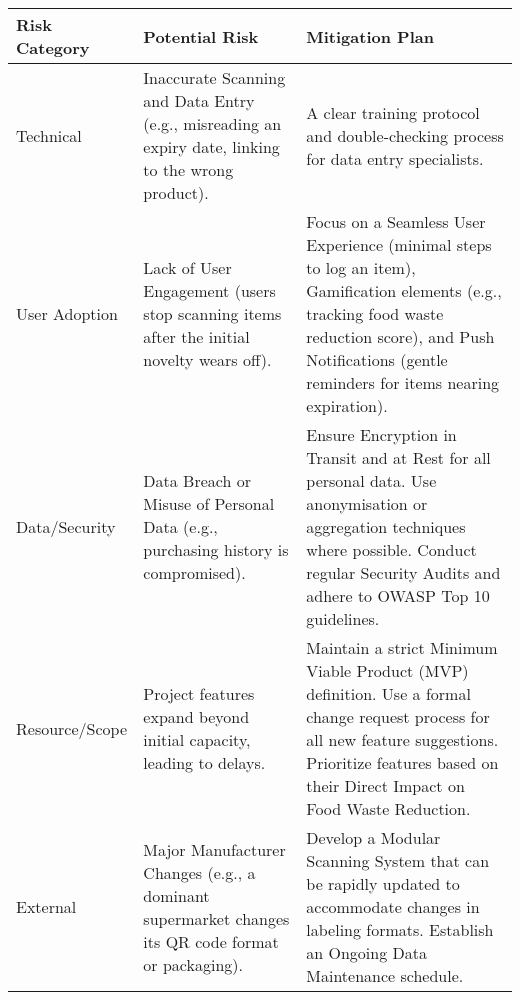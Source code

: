 \begin{center}
\begin{tabular}{| p{2cm} | p{5cm} | p{7cm} |}
    \hline
    \textbf{Risk Category} & \textbf{Potential Risk} & \textbf{Mitigation Plan} \\
    \hline
    Technical & Inaccurate Scanning and Data Entry (e.g., misreading an expiry date, linking to the wrong product). & A clear training protocol and double-checking process for data entry specialists. \\
    \hline
    User Adoption & Lack of User Engagement (users stop scanning items after the initial novelty wears off). & Focus on a Seamless User Experience (minimal steps to log an item), Gamification elements (e.g., tracking food waste reduction score), and Push Notifications (gentle reminders for items nearing expiration). \\
    \hline
    Data/Security & Data Breach or Misuse of Personal Data (e.g., purchasing history is compromised). & Ensure Encryption in Transit and at Rest for all personal data. Use anonymisation or aggregation techniques where possible. Conduct regular Security Audits and adhere to OWASP Top 10 guidelines. \\
    \hline
    Resource/Scope & Project features expand beyond initial capacity, leading to delays. & Maintain a strict Minimum Viable Product (MVP) definition. Use a formal change request process for all new feature suggestions. Prioritize features based on their Direct Impact on Food Waste Reduction. \\
    \hline
    External & Major Manufacturer Changes (e.g., a dominant supermarket changes its QR code format or packaging). & Develop a Modular Scanning System that can be rapidly updated to accommodate changes in labeling formats. Establish an Ongoing Data Maintenance schedule. \\
    \hline
\end{tabular}
\end{center}